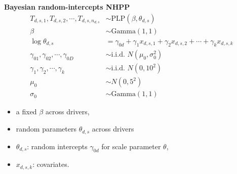 \begin{frame}{\textbf{Bayesian random-intercepts NHPP}}
\begin{equation}\label{eq:nhpp}
\begin{aligned}
T_{d, s, 1}, T_{d, s, 2}, \cdots , T_{d, s, n_{d, s}} & \sim \text{PLP}(\beta, \theta_{d, s})\\
\beta & \sim \text{Gamma}(1, 1)\\
\log\theta_{d, s} &= \gamma_{0d} + \gamma_{1}x_{d, s, 1} + \gamma_{2}x_{d, s, 2} + \cdots + \gamma_{k}x_{d, s, k}\\
\gamma_{01}, \gamma_{02}, \cdots, \gamma_{0D} & \sim \text{i.i.d. }N(\mu_0, \sigma_0^2)\\
\gamma_1, \gamma_2, \cdots, \gamma_k & \sim \text{i.i.d. }N(0, 10^2)\\
\mu_0 &\sim N(0, 5^2) \\
\sigma_0 &\sim \text{Gamma}(1, 1)
\end{aligned}
\end{equation}
\begin{itemize}
    \item a fixed $\beta$ across drivers, 
    \item random parameters $\theta_{d, s}$ across drivers
    \item $\theta_{d, s}$: random intercepts $\gamma_{0d}$ for scale parameter $\theta$,
    \item $x_{d, s, k}$: covariates.
\end{itemize}
\end{frame}

